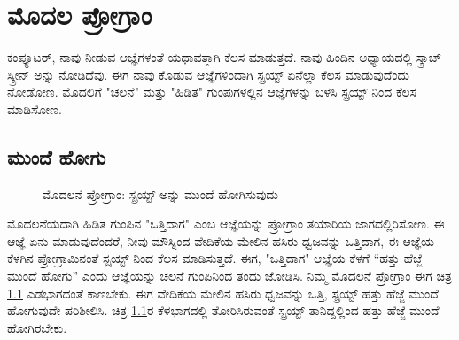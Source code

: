 \chapter{ಮೊದಲ ಪ್ರೋಗ್ರಾಂ}
ಕಂಪ್ಯೂಟರ್, ನಾವು ನೀಡುವ ಆಜ್ಞೆಗಳಂತೆ ಯಥಾವತ್ತಾಗಿ ಕೆಲಸ ಮಾಡುತ್ತದೆ.  ನಾವು ಹಿಂದಿನ ಅಧ್ಯಾಯದಲ್ಲಿ ಸ್ಕ್ರಾಚ್ ಸ್ಕ್ರೀನ್ ಅನ್ನು ನೋಡಿದೆವು. ಈಗ ನಾವು ಕೊಡುವ ಆಜ್ಞೆಗಳಿಂದಾಗಿ ಸ್ಪ್ರಯ್ಟ್  ಏನೆಲ್ಲಾ ಕೆಲಸ ಮಾಡುವುದೆಂದು ನೋಡೋಣ.  ಮೊದಲಿಗೆ "ಚಲನೆ" ಮತ್ತು "ಹಿಡಿತ" ಗುಂಪುಗಳಲ್ಲಿನ  ಆಜ್ಞೆಗಳನ್ನು ಬಳಸಿ ಸ್ಪ್ರಯ್ಟ್ ನಿಂದ ಕೆಲಸ ಮಾಡಿಸೋಣ. 



\section{ಮುಂದೆ ಹೋಗು}
\begin{figure}[h]
\begin{center}
\begin{multicols}{2}
\begin{Scratch}[1]
\beginbox{}
\end{Scratch}

\end{multicols}
\end{center}

\caption{ಮೊದಲನೆ ಪ್ರೋಗ್ರಾಂ: ಸ್ಪ್ರಯ್ಟ್  ಅನ್ನು ಮುಂದೆ ಹೋಗಿಸುವುದು}
\label{program1}
\end{figure}

\vspace{-0.5cm}
ಮೊದಲನೆಯದಾಗಿ ಹಿಡಿತ ಗುಂಪಿನ "ಒತ್ತಿದಾಗ" ಎಂಬ ಆಜ್ಞೆಯನ್ನು ಪ್ರೋಗ್ರಾಂ ತಯಾರಿಯ ಜಾಗದಲ್ಲಿರಿಸೋಣ.  ಈ ಆಜ್ಞೆ ಏನು ಮಾಡುವುದೆಂದರೆ,  ನೀವು ಮೌಸ್ನಿಂದ ವೇದಿಕೆಯ ಮೇಲಿನ ಹಸಿರು ಧ್ವಜವನ್ನು ಒತ್ತಿದಾಗ, ಈ ಆಜ್ಞೆಯ ಕೆಳಗಿನ ಪ್ರೋಗ್ರಾಮಿನಂತೆ ಸ್ಪ್ರಯ್ಟ್ ನಿಂದ ಕೆಲಸ ಮಾಡಿಸುತ್ತದೆ. ಈಗ, "ಒತ್ತಿದಾಗ" ಆಜ್ಞೆಯ ಕೆಳಗೆ “ಹತ್ತು ಹೆಜ್ಜೆ ಮುಂದೆ ಹೋಗು” ಎಂದು ಆಜ್ಞೆಯನ್ನು ಚಲನೆ ಗುಂಪಿನಿಂದ ತಂದು ಜೋಡಿಸಿ.  ನಿಮ್ಮ ಮೊದಲನೆ ಪ್ರೋಗ್ರಾಂ ಈಗ ಚಿತ್ರ \ref{program1}  ಎಡಭಾಗದಂತೆ ಕಾಣಬೇಕು.  ಈಗ ವೇದಿಕೆಯ ಮೇಲಿನ ಹಸಿರು ಧ್ವಜವನ್ನು ಒತ್ತಿ,  ಸ್ಪ್ರಯ್ಟ್ ಹತ್ತು ಹೆಜ್ಜೆ ಮುಂದೆ ಹೋಗುವುದೇ ಪರಿಶೀಲಿಸಿ.  ಚಿತ್ರ \ref{program1}ರ ಕೆಳಭಾಗದಲ್ಲಿ ತೋರಿಸಿರುವಂತೆ ಸ್ಪ್ರಯ್ಟ್ ತಾನಿದ್ದಲ್ಲಿಂದ ಹತ್ತು ಹೆಜ್ಜೆ ಮುಂದೆ ಹೋಗಿರಬೇಕು. 

